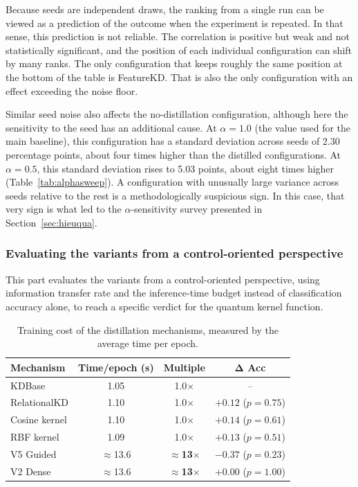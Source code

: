 Because seeds are independent draws, the ranking from a single run
can be viewed as a prediction of the outcome when the experiment is
repeated. In that sense, this prediction is not reliable. The
correlation is positive but weak and not statistically significant,
and the position of each individual configuration can shift by many
ranks. The only configuration that keeps roughly the same position
at the bottom of the table is FeatureKD. That is also the only
configuration with an effect exceeding the noise floor.

Similar seed noise also affects the no-distillation configuration,
although here the sensitivity to the seed has an additional cause.
At $\alpha = 1.0$ (the value used for the main baseline), this
configuration has a standard deviation across seeds of 2.30
percentage points, about four times higher than the distilled
configurations. At $\alpha = 0.5$, this standard deviation rises to
5.03 points, about eight times higher (Table~\ref{tab:alphasweep}).
A configuration with unusually large variance across seeds relative
to the rest is a methodologically suspicious sign. In this case,
that very sign is what led to the $\alpha$-sensitivity survey
presented in Section~\ref{sec:hieuqua}.

\subsubsection{Evaluating the variants from a control-oriented perspective}
\label{sec:danhgiadk}

This part evaluates the variants from a control-oriented
perspective, using information transfer rate and the inference-time
budget instead of classification accuracy alone, to reach a specific
verdict for the quantum kernel function.

\begin{table}[!htbp]
\centering
\caption{Training cost of the distillation mechanisms, measured by
the average time per epoch.}
\label{tab:chiphi}
\begin{tabular}{lccc}
\toprule
\textbf{Mechanism} & \textbf{Time/epoch (s)} & \textbf{Multiple} & $\boldsymbol{\Delta}$ \textbf{Acc} \\
\midrule
KDBase & 1.05 & 1.0$\times$ & -- \\
RelationalKD & 1.10 & 1.0$\times$ & $+0.12$ ($p = 0.75$) \\
Cosine kernel & 1.10 & 1.0$\times$ & $+0.14$ ($p = 0.61$) \\
RBF kernel & 1.09 & 1.0$\times$ & $+0.13$ ($p = 0.51$) \\
V5 Guided & $\approx$13.6 & \textbf{$\approx$13}$\boldsymbol{\times}$ & $-0.37$ ($p = 0.23$) \\
V2 Dense & $\approx$13.6 & \textbf{$\approx$13}$\boldsymbol{\times}$ & $+0.00$ ($p = 1.00$) \\
\bottomrule
\end{tabular}
\end{table}
\FloatBarrier


